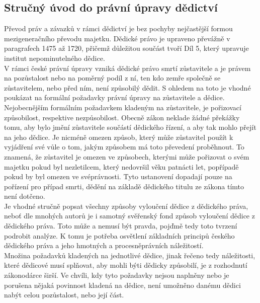 \documentclass{article}
\begin{document}
\subsection{Stručný úvod do právní úpravy dědictví}

Převod práv a závazků v rámci dědictví je bez pochyby nejčastější formou mezigeneračního převodu majetku. Dědické právo je upraveno převážně v paragrafech 1475 až 1720, přičemž důležitou součást tvoří Díl 5, který upravuje institut nepominutelného dědice.\\

V rámci české právní úpravy vzniká dědické právo smrtí zůstavitele a je právem na pozůstalost nebo na poměrný podíl z ní, ten kdo zemře společně se zůstavitelem, nebo před ním, není způsobilý dědit. S ohledem na toto je vhodné poukázat na formální požadavky právní úpravy na zůstavitele a dědice. Nejobecnějším formálním požadavkem kladeným na zůstavitele, je pořizovací způsobilost, respektive nezpůsobilost. Obecně zákon neklade žádné překážky tomu, aby bylo jmění zůstavitele součástí dědického řízení, a aby tak mohlo přejít na jeho dědice. Je nicméně omezen způsob, který může zůstavitel použít k vyjádření své vůle o tom, jakým způsobem má toto převedení proběhnout. To znamená, že zůstavitel je omezen ve způsobech, kterými může pořizovat o svém majetku pokud byl nezletilcem, který nedovršil věku patnácti let, popřípadě pokud by byl omezen ve svéprávnosti. Tyto ustanovení dopadají pouze na pořízení pro případ smrti, dědění na základě dědického titulu ze zákona tímto není dotčeno. \\

Je vhodné stručně popsat všechny způsoby vyloučení dědice z dědického práva, neboť dle mnohých autorů je i samotný svěřenský fond způsob vyloučení dědice z dědického práva. Toto může a nemusí být pravda, pojďmě tedy toto tvrzení podrobit analýze. K tomu je potřeba osvětlení základních principů českého dědického práva a jeho hmotných a procesněprávních náležitostí.\\

Množina požadavků kladených na jednotlivé dědice, jinak řečeno tedy náležitosti, které dědicové musí splňovat, aby mohli býti dědicky způsobilí, je z rozhodnutí zákonodárce širší. Ve chvíli, kdy tyto požadavky nejsou naplněny nebo je porušena nějaká povinnost kladená na dědice, není umožněno danému dědici nabýt celou pozůstalost, nebo její část. \\
\end{document}
